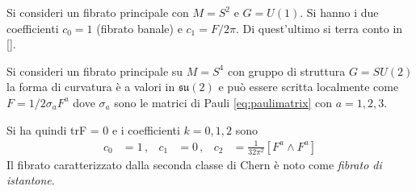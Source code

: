 \begin{example}\label{ex:monopolechern}
   Si consideri un fibrato principale con $M = S^2$ e $G = U(1)$. Si hanno i due
   coefficienti $c_0 = 1$ (fibrato banale) e $c_1 = F/2\pi$. Di quest'ultimo si
   terra conto in \ref{}.\\
\end{example}

\begin{example}\label{ex:istantonchern}
   Si consideri un fibrato principale su $M = S^4$ con gruppo di struttura
   $G = SU(2)$ la forma di curvatura è a valori in $\mathfrak{su(2)}$ e può
   essere scritta localmente come $F = 1/2\sigma_a F^a$ dove $\sigma_a$ sono le
   matrici di Pauli \ref{eq:paulimatrix} con $a = 1,2,3$.

   Si ha quindi trF = 0 e i coefficienti $k = 0,1,2$ sono
   \begin{equation}
      \begin{aligned}
         c_0 & = 1 \, ,&
         c_1 & = 0 \, ,&
         c_2 & = \frac{1}{32\pi^2}[ F^a \wedge F^a ]
      \end{aligned}
   \end{equation}
   Il fibrato caratterizzato dalla seconda classe di Chern è noto come
   \emph{fibrato di istantone}.
\end{example}
